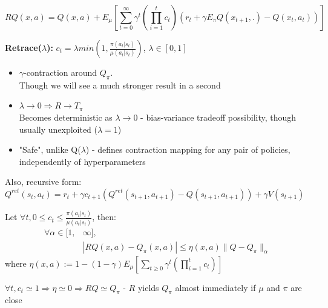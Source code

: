 \documentclass{beamer}
\begin{document}
\begin{frame}[t]

\begin{equation*}
R Q (x,a) = Q(x,a) + E_\mu \left[ \sum_{t=0}^\infty \gamma^t \left( \prod_{i=1}^{t} c_t \right) \left( r_t + \gamma E_\pi Q (x_{t+1},.) - Q(x_t,a_t) \right) \right]
\end{equation*}

\textbf{Retrace($\lambda$):} $c_t = \lambda min \left(1, \frac{\pi(a_t | s_t) }{\mu(a_t | s_t)} \right)$, $\lambda \in [0,1]$\\

\begin{itemize}
\item $\gamma$-contraction around $Q_\pi$.\\ Though we will see a much stronger result in a second\\

\item $\lambda \rightarrow 0 \Rightarrow R \rightarrow T_\pi$\\
Becomes deterministic as $\lambda \rightarrow 0$ - bias-variance tradeoff possibility, though usually unexploited ($\lambda = 1$)

\item "Safe", unlike Q($\lambda$) - defines contraction mapping for any pair of policies, independently of hyperparameters
\end{itemize}
Also, recursive form:\\
$Q^{ret}(s_t,a_t) = r_t + \gamma c_{t+1} (Q^{ret}(s_{t+1}, a_{t+1}) - Q (s_{t+1}, a_{t+1})) + \gamma V(s_{t+1})$
\end{frame}

\begin{frame}
\begin{theorem}
Let $\forall t, 0  \leq c_t \leq \frac{\pi(a_t|s_t) }{\mu(a_t | s_t)}$, then:
\begin{align*}
 \forall \alpha \in  [1, & \infty],\\
& |RQ(x,a) - Q_\pi(x,a)| \leq \eta(x,a) \parallel Q - Q_\pi  \parallel_\alpha
\end{align*}
where $\eta(x,a) := 1 - (1-\gamma) E_\mu \left[ \sum_{t \geq 0} \gamma^t \left( \prod_{i=1}^t c_t \right) \right]$
\end{theorem}

 $\forall t, c_t \simeq 1 \Rightarrow \eta \simeq 0 \Rightarrow R Q \simeq Q_\pi$ - $R$ yields $Q_\pi$ almost immediately if $\mu$ and $\pi$ are close\\
 
\vspace{3mm}
 
\end{frame}
\end{document}
